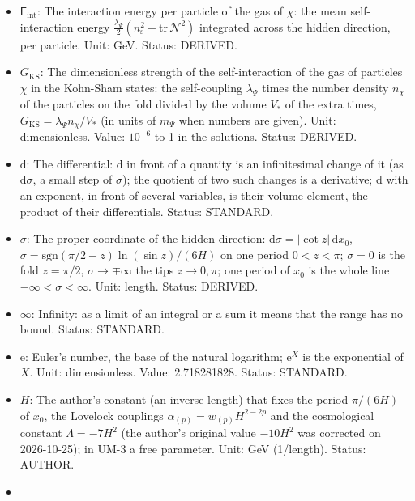 \documentclass[
  10pt,
]{article}
\providecommand{\tightlist}{%
  \setlength{\itemsep}{0pt}\setlength{\parskip}{0pt}}
\begin{document}
\begin{itemize}
\tightlist
\item
  \(\mathsf{E}_{\mathrm{int}}\): The interaction energy per particle of
  the gas of \(\chi\): the mean self-interaction energy
  \(\frac{\lambda_\Psi}{2}(n_{\mathrm{s}}^2 - \mathrm{tr}\,\mathcal{N}^2)\)
  integrated across the hidden direction, per particle. Unit: GeV.
  Status: DERIVED.
\item
  \(G_{\mathrm{KS}}\): The dimensionless strength of the
  self-interaction of the gas of particles \(\chi\) in the Kohn-Sham
  states: the self-coupling \(\lambda_\Psi\) times the number density
  \(n_\chi\) of the particles on the fold divided by the volume \(V_*\)
  of the extra times, \(G_{\mathrm{KS}} = \lambda_\Psi n_\chi/V_*\) (in
  units of \(m_\Psi\) when numbers are given). Unit: dimensionless.
  Value: \(10^{-6}\) to 1 in the solutions. Status: DERIVED.
\item
  \(\mathrm{d}\): The differential: \(\mathrm{d}\) in front of a
  quantity is an infinitesimal change of it (as \(\mathrm{d}\sigma\), a
  small step of \(\sigma\)); the quotient of two such changes is a
  derivative; \(\mathrm{d}\) with an exponent, in front of several
  variables, is their volume element, the product of their
  differentials. Status: STANDARD.
\item
  \(\sigma\): The proper coordinate of the hidden direction:
  \(\mathrm{d}\sigma = \lvert\cot z\rvert\,\mathrm{d}x_0\),
  \(\sigma = \mathrm{sgn}(\pi/2 - z)\ln(\sin z)/(6H)\) on one period
  \(0 < z < \pi\); \(\sigma = 0\) is the fold \(z = \pi/2\),
  \(\sigma \to \mp\infty\) the tips \(z \to 0, \pi\); one period of
  \(x_0\) is the whole line \(-\infty < \sigma < \infty\). Unit: length.
  Status: DERIVED.
\item
  \(\infty\): Infinity: as a limit of an integral or a sum it means that
  the range has no bound. Status: STANDARD.
\item
  \(\mathrm{e}\): Euler's number, the base of the natural logarithm;
  \(\mathrm{e}^{X}\) is the exponential of \(X\). Unit: dimensionless.
  Value: 2.718281828. Status: STANDARD.
\item
  \(H\): The author's constant (an inverse length) that fixes the period
  \(\pi/(6H)\) of \(x_0\), the Lovelock couplings
  \(\alpha_{(p)} = w_{(p)}H^{2-2p}\) and the cosmological constant
  \(\Lambda = -7H^2\) (the author's original value \(-10H^2\) was
  corrected on 2026-10-25); in UM-3 a free parameter. Unit: GeV
  (1/length). Status: AUTHOR.
\item

\end{itemize}
\end{document}
